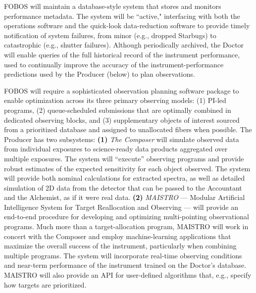 \documentclass[oneside,11pt]{amsart}
\begin{document}
\smallskip

 FOBOS will maintain a database-style
system that stores and monitors performance metadata. The system will
be ``active," interfacing with both the operations software and the
quick-look data-reduction software to provide timely notification of
system failures, from minor (e.g., dropped Starbugs) to catastrophic
(e.g., shutter failures). Although periodically archived, the Doctor
will enable queries of the full historical record of the instrument
performance, used to continually improve the accuracy of the
instrument-performance predictions used by the Producer (below) to
plan observations.

\smallskip

 FOBOS will require a sophisticated
observation planning software package to enable optimization across
its three primary observing models: (1) PI-led programs, (2)
queue-scheduled submissions that are optimally combined in dedicated
observing blocks, and (3) supplementary objects of interest sourced
from a prioritized database and assigned to unallocated fibers when
possible. The Producer has two subsystems: {\bf (1)} {\it The
Composer} will simulate observed data from individual exposures to
science-ready data products aggregated over multiple exposures. The
system will ``execute'' observing programs and provide robust
estimates of the expected sensitivity for each object observed.
The system will provide both nominal calculations for extracted
spectra, as well as detailed simulation of 2D data from the detector
that can be passed to the Accountant and the Alchemist, as if it were
real data. {\bf (2)} {\it MAISTRO} --- Modular Artificial Intelligence
System for Target Reallocation and Observing --- will provide an
end-to-end procedure for developing and optimizing multi-pointing
observational programs. Much more than a target-allocation program,
MAISTRO will work in concert with the Composer and employ
machine-learning applications that maximize the overall success of
the instrument, particularly when combining multiple programs. The
system will incorporate real-time observing conditions and near-term
performance of the instrument trained on the Doctor’s database.
MAISTRO will also provide an API for user-defined algorithms that,
e.g., specify how targets are prioritized.

\smallskip
\end{document}
